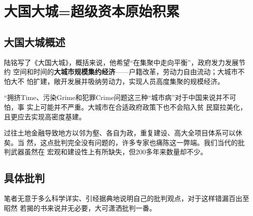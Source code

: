 \section{大国大城=超级资本原始积累}

\subsection{大国大城概述}

陆铭写了《大国大城》，概括来说，他希望“在集聚中走向平衡”，政府发力发展节约
空间和时间的\textbf{大城市规模集约经济}——户籍改革，劳动力自由流动；大城市不怕大不
怕扩建，敞开发展并吸纳劳动力，实现人员高度集聚的规模经济。

“拥挤Time、污染Grime和犯罪Crime问题这三种“城市病”对于中国来说并不可怕，事
实上可能并不严重。大城市在合适政府政策下也不会陷入贫
民窟拉美化，且更应去实现高密度基建。

过往土地金融导致地方以邻为壑、各自为政，重复建设、高大全项目体系可以休矣。当
然，这点批判完全没有问题的，许多专家也痛陈这一弊端。我们当代的批判武器虽然在
宏观和建设性上有所缺失，但200多年来数量却不少。

\subsection{具体批判}

笔者无意于多么科学详实、引经据典地说明自己的批判观点，对于这样错漏百出至昭然
若揭的书来说并无必要，大可潇洒批判一番。

